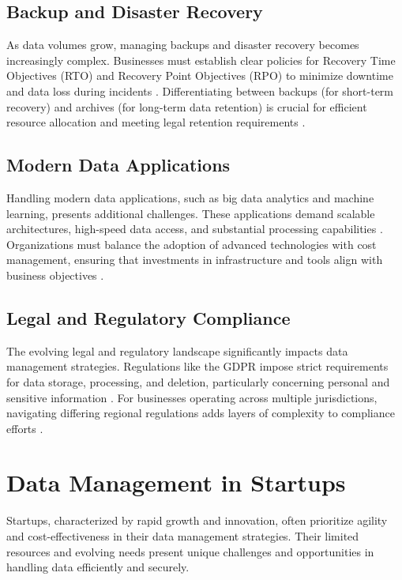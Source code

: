 \documentclass{article}
\begin{document}
\subsection*{Backup and Disaster Recovery}

As data volumes grow, managing backups and disaster recovery becomes increasingly complex. Businesses must establish clear policies for Recovery Time Objectives (RTO) and Recovery Point Objectives (RPO) to minimize downtime and data loss during incidents \cite{bci2018}. Differentiating between backups (for short-term recovery) and archives (for long-term data retention) is crucial for efficient resource allocation and meeting legal retention requirements \cite{igi2019}.

\subsection*{Modern Data Applications}

Handling modern data applications, such as big data analytics and machine learning, presents additional challenges. These applications demand scalable architectures, high-speed data access, and substantial processing capabilities \cite{mckinsey2018}. Organizations must balance the adoption of advanced technologies with cost management, ensuring that investments in infrastructure and tools align with business objectives \cite{forbes2019}.

\subsection*{Legal and Regulatory Compliance}

The evolving legal and regulatory landscape significantly impacts data management strategies. Regulations like the GDPR impose strict requirements for data storage, processing, and deletion, particularly concerning personal and sensitive information \cite{eu2016}. For businesses operating across multiple jurisdictions, navigating differing regional regulations adds layers of complexity to compliance efforts \cite{deloitte2020}.

\section*{Data Management in Startups} \cite{openai2024chatgpt}

Startups, characterized by rapid growth and innovation, often prioritize agility and cost-effectiveness in their data management strategies. Their limited resources and evolving needs present unique challenges and opportunities in handling data efficiently and securely.
\end{document}
